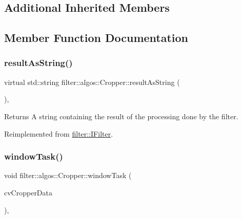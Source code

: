 \subsection*{Additional Inherited Members}


\subsection{Member Function Documentation}
\mbox{\label{classfilter_1_1algos_1_1_cropper_ae970d5d448587b8288aca2484f12f2fa}} 
\subsubsection{\texorpdfstring{result\+As\+String()}{resultAsString()}}
{\footnotesize\ttfamily virtual std\+::string filter\+::algos\+::\+Cropper\+::result\+As\+String (\begin{DoxyParamCaption}{ }\end{DoxyParamCaption})\hspace{0.3cm}{\ttfamily [inline]}, {\ttfamily [virtual]}}

\begin{DoxyReturn}{Returns}
A string containing the result of the processing done by the filter. 
\end{DoxyReturn}


Reimplemented from \hyperlink{classfilter_1_1_i_filter_ab99902b060a6d9edc3452a8c9f85e37e}{filter\+::\+I\+Filter}.

\mbox{\label{classfilter_1_1algos_1_1_cropper_ad3cd43717d82f4d581bc2a1ed5f545e6}} 
\subsubsection{\texorpdfstring{window\+Task()}{windowTask()}}
{\footnotesize\ttfamily void filter\+::algos\+::\+Cropper\+::window\+Task (\begin{DoxyParamCaption}\item[{std\+::shared\+\_\+ptr$<$ \hyperlink{classfilter_1_1algos_1_1_cropper_1_1_c_v_cropper_data}{filter\+::algos\+::\+Cropper\+::\+C\+V\+Cropper\+Data} $>$}]{cv\+Cropper\+Data }\end{DoxyParamCaption})\hspace{0.3cm}{\ttfamily [inline]}, {\ttfamily [private]}}


